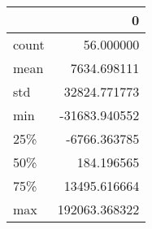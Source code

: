 \begin{tabular}{lr}
\toprule
{} &              0 \\
\midrule
count &      56.000000 \\
mean  &    7634.698111 \\
std   &   32824.771773 \\
min   &  -31683.940552 \\
25\%   &   -6766.363785 \\
50\%   &     184.196565 \\
75\%   &   13495.616664 \\
max   &  192063.368322 \\
\bottomrule
\end{tabular}
